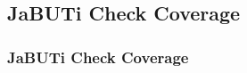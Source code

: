 \subsection{JaBUTi Check Coverage}
\label{example:jabuti-check-coverage}

\begin{frame}
\frametitle{JaBUTi Check Coverage}

\end{frame}
